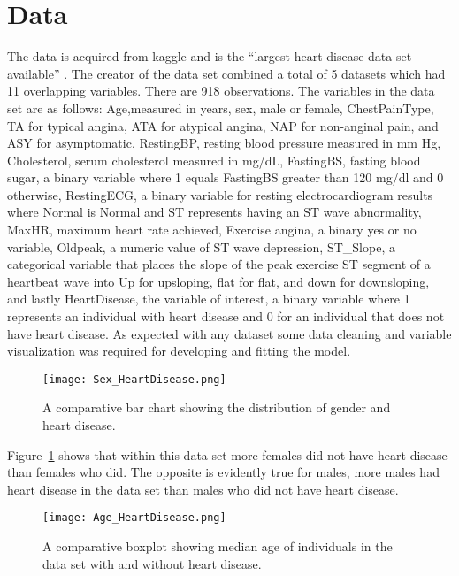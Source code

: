 \documentclass[12pt]{article}
\begin{document}


\section{Data}
\label{sec:data}

The data is acquired from kaggle and is the “largest heart disease data set available” \citep*{CitekeyMisc}. The creator of the data set combined a total of 5 datasets which had 11 overlapping variables. There are 918 observations. The variables in the data set are as follows: Age,measured in years, sex, male or female, ChestPainType, TA for typical angina, ATA for atypical angina, NAP for non-anginal pain, and ASY for asymptomatic, RestingBP, resting blood pressure measured in mm Hg, Cholesterol, serum cholesterol measured in mg/dL, FastingBS, fasting blood sugar, a binary variable where 1 equals FastingBS greater than 120 mg/dl and 0 otherwise, RestingECG, a binary variable for resting electrocardiogram results where Normal is Normal and ST represents having an ST wave abnormality, MaxHR, maximum heart rate achieved, Exercise angina, a binary yes or no variable, Oldpeak, a numeric value of ST wave depression, ST\_Slope, a categorical variable that places the slope of the peak exercise ST segment of a heartbeat wave into Up for upsloping, flat for flat, and down for downsloping, and lastly HeartDisease, the variable of interest, a binary variable where 1 represents an individual with heart disease and 0 for an individual that does not have heart disease. As expected with any dataset some data cleaning and variable visualization was required for developing and fitting the model. \par
\begin{figure}[tbp]
  \centering
  \texttt{[image: Sex\_HeartDisease.png]}
  \caption{A comparative bar chart showing the distribution of gender and heart disease.}
  \label{fig:heartdisease_and_sex}
\end{figure}
Figure~\ref*{fig:heartdisease_and_sex} shows that within this data set more females did not have heart disease than females who did. The opposite is evidently true for males, more males had heart disease in the data set than males who did not have heart disease. 
\begin{figure}[tbp]
  \centering
  \texttt{[image: Age\_HeartDisease.png]}
  \caption{A comparative boxplot showing median age of individuals in the data set with and without heart disease.}
  \label{fig:age_heartdisease}
\end{figure}
\end{document}
